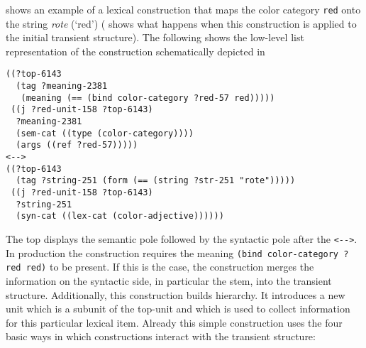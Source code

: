  shows an example of a lexical construction that maps 
the color category {\footnotesize\tt red} onto the string \textit{rote} (`red')
( shows what happens
when this construction is applied to the initial transient structure). 
The following shows the low-level list representation of the construction
schematically depicted in 
\ea\label{e:red-lex-list}
\begin{lstlisting} 
((?top-6143
  (tag ?meaning-2381 
   (meaning (== (bind color-category ?red-57 red)))))
 ((j ?red-unit-158 ?top-6143)
  ?meaning-2381
  (sem-cat ((type (color-category))))
  (args ((ref ?red-57)))))
<-->
((?top-6143
  (tag ?string-251 (form (== (string ?str-251 "rote")))))
 ((j ?red-unit-158 ?top-6143)
  ?string-251
  (syn-cat ((lex-cat (color-adjective))))))
\end{lstlisting}\z
The top displays the semantic pole followed by the syntactic pole after the 
{\footnotesize\verb|<-->|}. In production the construction requires
the meaning {\footnotesize\tt (bind color-category ?red red)} to be present.
If this is the case, the construction merges the information 
on the syntactic side, in particular the stem, into the transient structure.
Additionally, this construction builds hierarchy. It introduces a new unit
which is a subunit of the top-unit and which is used to collect
information for this particular lexical item. Already this simple 
construction uses the four basic ways in which constructions
interact with the transient structure:

